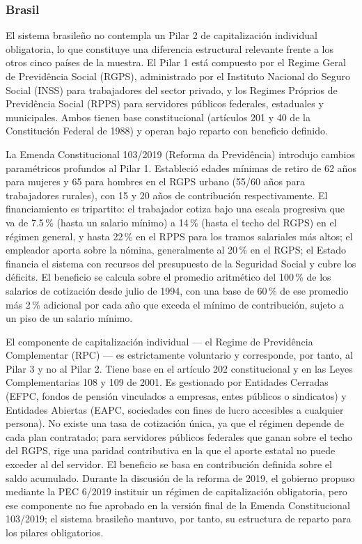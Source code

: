 \documentclass[12pt, letterpaper]{article}
\begin{document}
\subsubsection{Brasil}
\label{sec:brasil}

El sistema brasileño no contempla un Pilar 2 de capitalización individual obligatoria, lo que constituye una diferencia estructural relevante frente a los otros cinco países de la muestra. El Pilar 1 está compuesto por el Regime Geral de Previdência Social (RGPS), administrado por el Instituto Nacional do Seguro Social (INSS) para trabajadores del sector privado, y los Regimes Próprios de Previdência Social (RPPS) para servidores públicos federales, estaduales y municipales. Ambos tienen base constitucional (artículos 201 y 40 de la Constitución Federal de 1988) y operan bajo reparto con beneficio definido.

La Emenda Constitucional 103/2019 (Reforma da Previdência) introdujo cambios paramétricos profundos al Pilar 1. Estableció edades mínimas de retiro de 62 años para mujeres y 65 para hombres en el RGPS urbano (55/60 años para trabajadores rurales), con 15 y 20 años de contribución respectivamente. El financiamiento es tripartito: el trabajador cotiza bajo una escala progresiva que va de 7.5\,\% (hasta un salario mínimo) a 14\,\% (hasta el techo del RGPS) en el régimen general, y hasta 22\,\% en el RPPS para los tramos salariales más altos; el empleador aporta sobre la nómina, generalmente al 20\,\% en el RGPS; el Estado financia el sistema con recursos del presupuesto de la Seguridad Social y cubre los déficits. El beneficio se calcula sobre el promedio aritmético del 100\,\% de los salarios de cotización desde julio de 1994, con una base de 60\,\% de ese promedio más 2\,\% adicional por cada año que exceda el mínimo de contribución, sujeto a un piso de un salario mínimo.

El componente de capitalización individual --- el Regime de Previdência Complementar (RPC) --- es estrictamente voluntario y corresponde, por tanto, al Pilar 3 y no al Pilar 2. Tiene base en el artículo 202 constitucional y en las Leyes Complementarias 108 y 109 de 2001. Es gestionado por Entidades Cerradas (EFPC, fondos de pensión vinculados a empresas, entes públicos o sindicatos) y Entidades Abiertas (EAPC, sociedades con fines de lucro accesibles a cualquier persona). No existe una tasa de cotización única, ya que el régimen depende de cada plan contratado; para servidores públicos federales que ganan sobre el techo del RGPS, rige una paridad contributiva en la que el aporte estatal no puede exceder al del servidor. El beneficio se basa en contribución definida sobre el saldo acumulado. Durante la discusión de la reforma de 2019, el gobierno propuso mediante la PEC 6/2019 instituir un régimen de capitalización obligatoria, pero ese componente no fue aprobado en la versión final de la Emenda Constitucional 103/2019; el sistema brasileño mantuvo, por tanto, su estructura de reparto para los pilares obligatorios.
\end{document}

